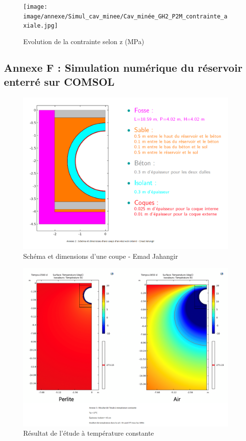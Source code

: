 \documentclass[11pt,french,a4paper]{article}
\begin{document}
\begin{figure}[h]
\centering
\texttt{[image: image/annexe/Simul\_cav\_minee/Cav\_minée\_GH2\_P2M\_contrainte\_axiale.jpg]}
\caption{Evolution de la contrainte selon z (MPa)}
\end{figure}

\newpage
\FloatBarrier
\subsection*{Annexe F : Simulation numérique du réservoir enterré sur COMSOL}
  
\begin{figure}[h]
\centering
\includegraphics[width=.8\linewidth]{image/annexe/reservoir_ent/Annexe_2.png}
\caption{Schéma et dimensions d'une coupe - Emad Jahangir }
\end{figure}
  
\begin{figure}[h]
\centering
\includegraphics[width=.8\linewidth]{image/annexe/reservoir_ent/Annexe_3.png}
\caption{Résultat de l'étude à température constante}
\end{figure}
  
\end{document}
